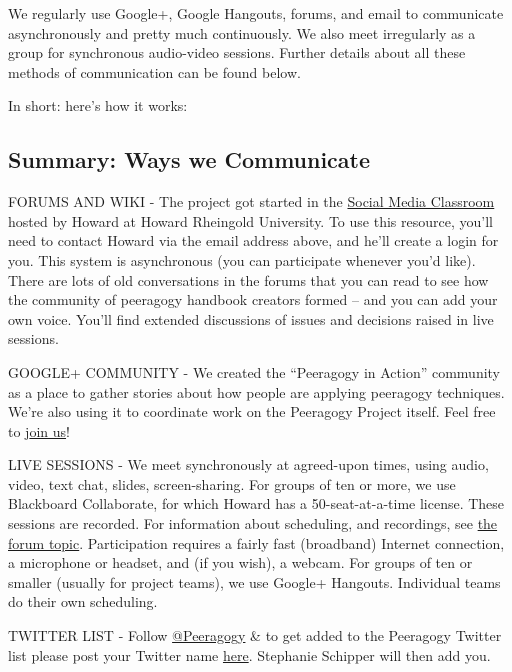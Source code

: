 We regularly use Google+, Google Hangouts, forums, and email to
communicate asynchronously and pretty much continuously. We also meet
irregularly as a group for synchronous audio-video sessions. Further
details about all these methods of communication can be found below.

In short: here's how it works:



\subsection{Summary: Ways we Communicate}

FORUMS AND WIKI - The project got started in the
\href{http://socialmediaclassroom.com/host/peeragogy/wiki/main-page}{Social
Media Classroom} hosted by Howard at Howard Rheingold University. To use
this resource, you'll need to contact Howard via the email address
above, and he'll create a login for you. This system is asynchronous
(you can participate whenever you'd like). There are lots of old
conversations in the forums that you can read to see how the community
of peeragogy handbook creators formed -- and you can add your own voice.
You'll find extended discussions of issues and decisions raised in live
sessions.

GOOGLE+ COMMUNITY - We created the ``Peeragogy in Action'' community as
a place to gather stories about how people are applying peeragogy
techniques. We're also using it to coordinate work on the Peeragogy
Project itself. Feel free to
j\href{https://plus.google.com/u/0/communities/107386162349686249470}{oin
us}!

LIVE SESSIONS - We meet synchronously at agreed-upon times, using audio,
video, text chat, slides, screen-sharing. For groups of ten or more, we
use Blackboard Collaborate, for which Howard has a 50-seat-at-a-time
license. These sessions are recorded. For information about scheduling,
and recordings, see
\href{http://socialmediaclassroom.com/host/peeragogy/forum/live-sessions-schedule-recordings-notes-mindmaps}{the
forum topic}. Participation requires a fairly fast (broadband) Internet
connection, a microphone or headset, and (if you wish), a webcam. For
groups of ten or smaller (usually for project teams), we use Google+
Hangouts. Individual teams do their own scheduling.

TWITTER LIST - Follow \href{http://twitter.com/Peeragogy/}{@Peeragogy}
\& to get added to the Peeragogy Twitter list please post your Twitter
name
\href{http://socialmediaclassroom.com/host/peeragogy/forum/the-tools-we-are-using-and-how-access-them}{here}.
Stephanie Schipper will then add you.

